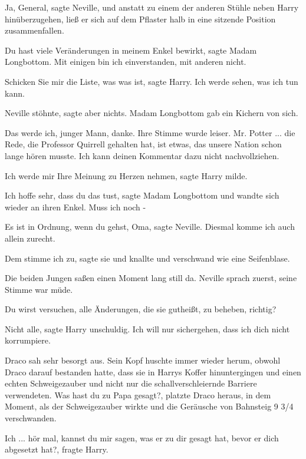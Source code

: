 \glqq{}Ja, General\grqq{}, sagte Neville, und anstatt zu einem der anderen
Stühle neben Harry hinüberzugehen, ließ er sich auf dem Pflaster halb in eine
sitzende Position zusammenfallen.

\glqq{}Du hast viele Veränderungen in meinem Enkel bewirkt\grqq{}, sagte Madam
Longbottom. \glqq{}Mit einigen bin ich einverstanden, mit anderen nicht.\grqq{}

\glqq{}Schicken Sie mir die Liste, was was ist\grqq{}, sagte Harry. \glqq{}Ich
werde sehen, was ich tun kann.\grqq{}

Neville stöhnte, sagte aber nichts. Madam Longbottom gab ein Kichern von sich.

\glqq{}Das werde ich, junger Mann, danke.\grqq{} Ihre Stimme wurde leiser. \glqq{}Mr.
Potter ... die Rede, die Professor Quirrell gehalten hat, ist etwas, das unsere
Nation schon lange hören musste. Ich kann deinen Kommentar dazu nicht
nachvollziehen.\grqq{}

\glqq{}Ich werde mir Ihre Meinung zu Herzen nehmen\grqq{}, sagte Harry milde.

\glqq{}Ich hoffe sehr, dass du das tust\grqq{}, sagte Madam Longbottom und
wandte sich wieder an ihren Enkel. \glqq{}Muss ich noch -\grqq{}

\glqq{}Es ist in Ordnung, wenn du gehst, Oma\grqq{}, sagte Neville.
\glqq{}Diesmal komme ich auch allein zurecht.\grqq{}

\glqq{}Dem stimme ich zu\grqq{}, sagte sie und knallte und verschwand wie eine
Seifenblase.

Die beiden Jungen saßen einen Moment lang still da. Neville sprach zuerst, seine
Stimme war müde.

\glqq{}Du wirst versuchen, alle Änderungen, die sie gutheißt, zu beheben,
richtig?\grqq{}

\glqq{}Nicht alle\grqq{}, sagte Harry unschuldig. \glqq{}Ich will nur
sichergehen, dass ich dich nicht korrumpiere.\grqq{}

Draco sah sehr besorgt aus. Sein Kopf huschte immer wieder herum, obwohl Draco
darauf bestanden hatte, dass sie in Harrys Koffer hinuntergingen und einen
echten Schweigezauber und nicht nur die schallverschleiernde Barriere
verwendeten. \glqq{}Was hast du zu Papa gesagt?\grqq{}, platzte Draco heraus,
in dem Moment, als der Schweigezauber wirkte und die Geräusche von Bahnsteig 9
3/4 verschwanden.

\glqq{}Ich ... hör mal, kannst du mir sagen, was er zu dir gesagt hat, bevor er
dich abgesetzt hat?\grqq{}, fragte Harry.

